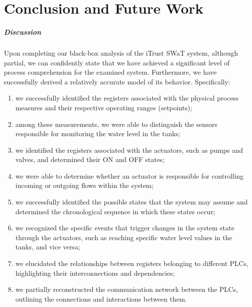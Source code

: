 \chapter{Conclusion and Future Work}
\label{conclusions}
\linenumbers

\paragraph{Discussion}
\label{par:7_discussion}
Upon completing our black-box analysis of the iTrust SWaT system, although partial, we can confidently state that we have achieved a significant level of process comprehension for the examined system. Furthermore, we have successfully derived a relatively accurate model of its behavior. Specifically:

\begin{enumerate}
	\item we successfully identified the registers associated with the physical process measures and their respective operating ranges (setpoints);
	
	\item among these measurements, we were able to distinguish the sensors responsible for monitoring the water level in the tanks;
	
	\item we identified the registers associated with the actuators, such as pumps and valves, and determined their ON and OFF states;
	
	\item we were able to determine whether an actuator is responsible for controlling incoming or outgoing flows within the system;
	
	\item we successfully identified the possible states that the system may assume and determined the chronological sequence in which these states occur;
	
	\item we recognized the specific events that trigger changes in the system state through the actuators, such as reaching specific water level values in the tanks, and vice versa;
	
	\item we elucidated the relationships between registers belonging to different PLCs, highlighting their interconnections and dependencies;
	
	\item we partially reconstructed the communication network between the PLCs, outlining the connections and interactions between them.
\end{enumerate}

